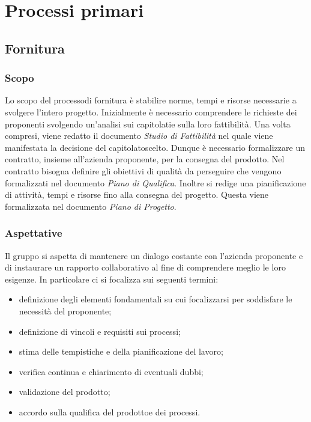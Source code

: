 \section{Processi primari}
	\subsection{Fornitura}
		\subsubsection{Scopo}
		Lo scopo del processo\glosp di fornitura è stabilire norme, tempi e risorse necessarie a svolgere l'intero progetto\glo.
		Inizialmente è necessario comprendere le richieste dei proponenti svolgendo un'analisi sui capitolati\glo e sulla loro fattibilità. Una volta compresi, viene redatto il documento \textit{Studio di Fattibilità} nel quale viene manifestata la decisione del capitolato\glosp scelto.
		Dunque è necessario formalizzare un contratto, insieme all'azienda proponente, per la consegna del prodotto\glo. Nel contratto bisogna definire gli obiettivi di qualità da perseguire che vengono formalizzati nel documento \textit{Piano di Qualifica}.
		Inoltre si redige una pianificazione di attività, tempi e risorse fino alla consegna del progetto. Questa viene formalizzata nel documento \textit{Piano di Progetto}.
		\subsubsection{Aspettative}
		Il gruppo si aspetta di mantenere un dialogo costante con l'azienda proponente e di instaurare un rapporto collaborativo al fine di comprendere meglio le loro esigenze. In particolare ci si focalizza sui seguenti termini:
		\begin{itemize}
			\item definizione degli elementi fondamentali su cui focalizzarsi per soddisfare le necessità del proponente;
			\item definizione di vincoli e requisiti sui processi\glo;
			\item stima delle tempistiche e della pianificazione del lavoro;
			\item verifica continua e chiarimento di eventuali dubbi;
			\item validazione del prodotto\glo;
			\item accordo sulla qualifica del prodotto\glosp e dei processi\glo.
		\end{itemize}
